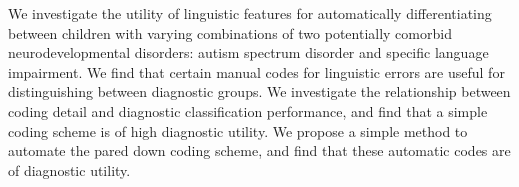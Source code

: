 We investigate the utility of linguistic features for automatically differentiating between children with varying combinations of two potentially
 comorbid neurodevelopmental disorders: autism spectrum disorder and specific
 language impairment. We find that certain manual codes for linguistic errors
 are useful for distinguishing between diagnostic groups. We investigate the
 relationship between coding detail and diagnostic classification performance,
 and find that a simple coding scheme is of high diagnostic utility. We propose
 a simple method to automate the pared down coding scheme, and find that these
 automatic codes are of diagnostic utility.

